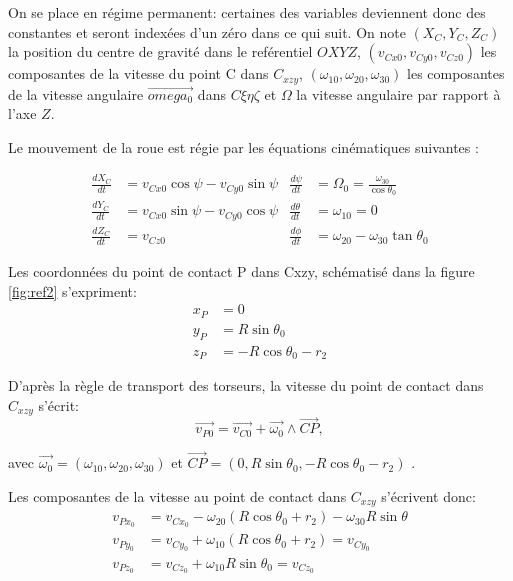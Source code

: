 On se place en régime permanent: certaines des variables deviennent donc des constantes et seront indexées d'un zéro dans ce qui suit.
On note $(X_C,Y_C,Z_C)$ la position du centre de gravité dans le reférentiel $OXYZ$, $(v_{Cx0},v_{Cy0},v_{Cz0})$ les composantes de la vitesse du point C dans $C_{xzy}$, $(\omega_{10},\omega_{20},\omega_{30})$ les composantes de la vitesse angulaire $\vec{omega_0}$ dans $C{\xi \eta \zeta}$ et $\Omega$ la vitesse angulaire par rapport à l'axe $Z$.

Le mouvement de la roue est régie par les équations cinématiques suivantes \cite{Batista}:

 \begin{align} 
    \frac{dX_C}{dt} &=v_{Cx0} \cos{\psi}- v_{Cy0} \sin{\psi}  & \frac{d\psi}{dt}&=\Omega_0=\frac{\omega_{30}}{\cos{\theta_0}} \nonumber\\
    \frac{dY_C}{dt} &=v_{Cx0} \sin{\psi}- v_{Cy0} \cos{\psi} & \frac{d\theta}{dt}&=\omega_{10}=0 \nonumber\\
    \frac{dZ_C}{dt} &=v_{Cz0} & \frac{d\phi}{dt}&=\omega_{20}-\omega_{30} \tan{\theta_0}
    \label{eq:b1}
\end{align}



Les coordonnées du point de contact P dans C{xzy}, schématisé dans la figure \ref{fig:ref2} s'expriment:
\begin{align}
    x_P&=0 \nonumber\\
    y_P&=R\sin{\theta_0} \nonumber\\
    z_P&=-R\cos{\theta_0}-r_2
  \label{eq:b2}
\end{align}

D'après la règle de transport des torseurs, la vitesse du point de contact dans $C_{xzy}$ s'écrit:
\begin{equation}
    \vec{v_{P0}}=\vec{v_{C0}}+\vec{\omega_0} \wedge \vec{CP},
  \label{eq:b3}
\end{equation}

avec $\vec{\omega_0}=(\omega_{10},\omega_{20},\omega_{30})$
et $\vec{CP}=(0,R\sin{\theta_0},-R\cos{\theta_0}-r_2)$ .



Les composantes de la vitesse au point de contact dans $C_{xzy}$ s'écrivent donc:
\begin{align}
    v_{Px_0}&=v_{Cx_0}-\omega_{20} (R\cos{\theta_0}+r_2) -\omega_{30} R\sin{\theta} \nonumber \\
    v_{Py_0}&=v_{Cy_0} + \omega_{10} (R\cos{\theta_0}+r_2)= v_{Cy_0} \nonumber\\
    v_{Pz_0}&=v_{Cz_0} + \omega_{10} R\sin{\theta_0} = v_{Cz_0}
  \label{eq:b4}
\end{align}

